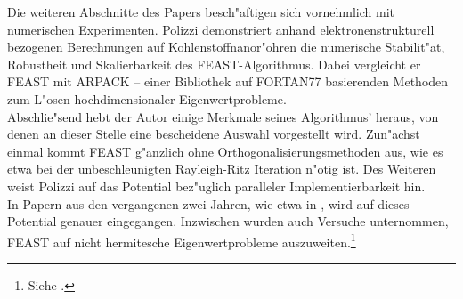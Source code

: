 Die weiteren Abschnitte des Papers besch"aftigen sich vornehmlich mit numerischen Experimenten. Polizzi demonstriert anhand elektronenstrukturell bezogenen Berechnungen auf Kohlenstoffnanor"ohren die numerische Stabilit"at, Robustheit und Skalierbarkeit des FEAST-Algorithmus. Dabei vergleicht er FEAST mit ARPACK -- einer Bibliothek auf FORTAN77 basierenden Methoden zum L"osen hochdimensionaler Eigenwertprobleme.\\

Abschlie"send hebt der Autor einige Merkmale seines Algorithmus' heraus, von denen an dieser Stelle eine bescheidene Auswahl vorgestellt wird. Zun"achst einmal kommt FEAST g"anzlich ohne Orthogonalisierungsmethoden aus, wie es etwa bei der unbeschleunigten Rayleigh-Ritz Iteration n"otig ist. Des Weiteren weist Polizzi auf das Potential bez"uglich paralleler Implementierbarkeit hin.\\

In Papern aus den vergangenen zwei Jahren, wie etwa in \cite[Abschnitt 4.1]{kpt}, wird auf dieses Potential genauer eingegangen. Inzwischen wurden auch Versuche unternommen, FEAST auf nicht hermitesche Eigenwertprobleme auszuweiten.\footnote{Siehe \cite{kpt}.}

